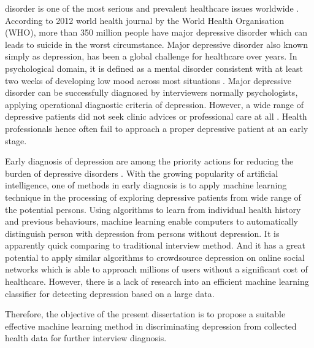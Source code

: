\documentclass[10pt,journal,compsoc]{IEEEtran}
\begin{document}
% 
% 
% 
% 
 disorder is one of the most serious and prevalent healthcare issues worldwide \cite{Wongkoblap}. According to 2012 world health journal by the World Health Organisation (WHO), more than 350 million people have major depressive disorder which can leads to suicide in the worst circumstance. Major depressive disorder also known simply as depression, has been a global challenge for healthcare over years. In psychological domain, it is defined as a mental disorder consistent with at least two weeks of developing low mood across most situations \cite{Zimmerman}. Major depressive disorder can be successfully diagnosed by interviewers normally psychologists, applying operational diagnostic criteria of depression. However, a wide range of depressive patients did not seek clinic advices or professional care at all \cite{Huerta-Ramirez}. Health professionals hence often fail to approach a proper depressive patient at an early stage. 

Early diagnosis of depression are among the priority actions for reducing the burden of depressive disorders \cite{Huerta-Ramirez}. With the growing popularity of artificial intelligence, one of methods in early diagnosis is to apply machine learning technique in the processing of exploring depressive patients from wide range of the potential persons. Using algorithms to learn from individual health history and previous behaviours, machine learning enable computers to automatically distinguish person with depression from persons without depression. It is apparently quick comparing to traditional interview method. And it has a great potential to apply similar algorithms to crowdsource depression on online social networks which is able to approach millions of users without a significant cost of healthcare. However, there is a lack of research into an efficient machine learning classifier for detecting depression based on a large data.

Therefore, the objective of the present dissertation is to propose a suitable effective machine learning method in discriminating depression from collected health data for further interview diagnosis. 
\end{document}
